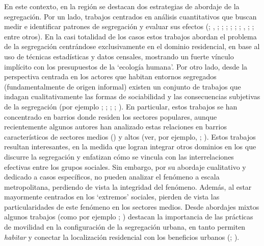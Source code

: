 \documentclass[
  spanish,
  a4paper,%
  chapterprefix=true,%
  DIV=calc,%
  twoside]{scrbook}%
\begin{document}
En este
contexto, en la región se destacan dos estrategias de abordaje de la
segregación. Por un lado, trabajos centrados en análisis cuantitativos
que buscan medir e identificar patrones de segregación y evaluar sus
efectos (; , ; ; ; ; ; ; , ; ;  entre otros). En la casi
totalidad de los casos estos trabajos abordan el problema de la
segregación centrándose exclusivamente en el dominio residencial, en
base al uso de técnicas estadísticas y datos censales, mostrando un
fuerte vínculo implícito con los presupuestos de la `ecología humana'.
Por otro lado, desde la perspectiva centrada en los actores que habitan
entornos segregados (fundamentalmente de origen informal) existen un
conjunto de trabajos que indagan cualitativamente las formas de
sociabilidad y las consecuencias subjetivas de la segregación (por
ejemplo ; ; ; ; ). En particular, estos trabajos se han concentrado en
barrios donde residen los sectores populares, aunque recientemente
algunos autores han analizado estas relaciones en barrios
característicos de sectores medios () y altos (ver, por
ejemplo, ; ). Estos trabajos resultan
interesantes, en la medida que logran integrar otros dominios en los que
discurre la segregación y enfatizan cómo se vincula con las
interrelaciones efectivas entre los grupos sociales. Sin embargo, por su
abordaje cualitativo y dedicado a casos específicos, no pueden analizar
el fenómeno a escala metropolitana, perdiendo de vista la integridad del
fenómeno. Además, al estar mayormente centrados en los `extremos'
sociales, pierden de vista las particularidades de este fenómeno en los
sectores medios. Desde abordajes mixtos algunos trabajos (como por
ejemplo ; ) destacan la importancia de las
prácticas de movilidad en la configuración de la segregación urbana, en
tanto permiten \emph{habitar} y conectar la localización residencial con los
beneficios urbanos (; ).
\end{document}
